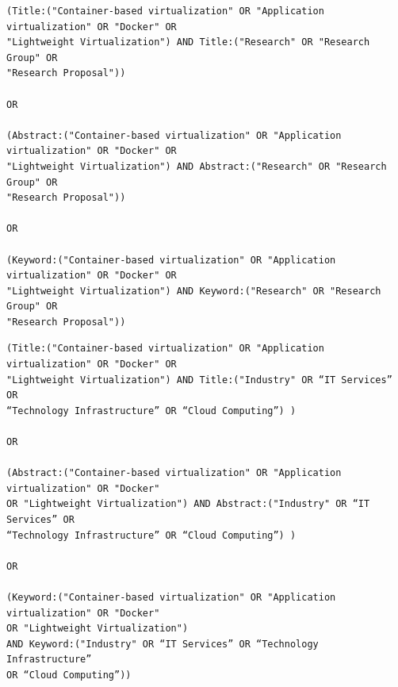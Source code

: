\begin{tcolorbox}[
  colback=gray!5, 
  colframe=black!60, 
  title=Cadena de búsqueda en ACM para investigación, 
  fonttitle=\bfseries, 
  sharp corners=south
]
\scriptsize %
\begin{verbatim}
(Title:("Container-based virtualization" OR "Application virtualization" OR "Docker" OR 
"Lightweight Virtualization") AND Title:("Research" OR "Research Group" OR 
"Research Proposal"))

OR

(Abstract:("Container-based virtualization" OR "Application virtualization" OR "Docker" OR 
"Lightweight Virtualization") AND Abstract:("Research" OR "Research Group" OR 
"Research Proposal"))

OR

(Keyword:("Container-based virtualization" OR "Application virtualization" OR "Docker" OR 
"Lightweight Virtualization") AND Keyword:("Research" OR "Research Group" OR 
"Research Proposal"))
\end{verbatim}
\end{tcolorbox}

\begin{tcolorbox}[
  colback=gray!5, 
  colframe=black!60, 
  title=Cadena de búsqueda en ACM para extensión, 
  fonttitle=\bfseries, 
  sharp corners=south
]
\scriptsize %
\begin{verbatim}
(Title:("Container-based virtualization" OR "Application virtualization" OR "Docker" OR 
"Lightweight Virtualization") AND Title:("Industry" OR “IT Services” OR 
“Technology Infrastructure” OR “Cloud Computing”) ) 

OR

(Abstract:("Container-based virtualization" OR "Application virtualization" OR "Docker" 
OR "Lightweight Virtualization") AND Abstract:("Industry" OR “IT Services” OR 
“Technology Infrastructure” OR “Cloud Computing”) )

OR

(Keyword:("Container-based virtualization" OR "Application virtualization" OR "Docker" 
OR "Lightweight Virtualization")
AND Keyword:("Industry" OR “IT Services” OR “Technology Infrastructure” 
OR “Cloud Computing”))

\end{verbatim}
\end{tcolorbox}

